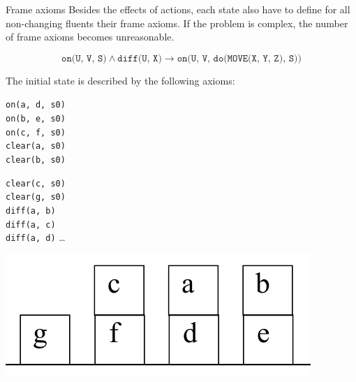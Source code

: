 \begin{descriptionlist}
    \item[Frame axioms]
        Besides the effects of actions, each state also have to define for all non-changing fluents their frame axioms.
        If the problem is complex, the number of frame axioms becomes unreasonable.
        \begin{example}
            \[ \texttt{on(U, V, S)} \land \texttt{diff(U, X)} \rightarrow \texttt{on(U, V, do(MOVE(X, Y, Z), S))} \]
        \end{example}
\end{descriptionlist}


\begin{example}
    The initial state is described by the following axioms:\\[0.5em]
    \begin{minipage}{.3\linewidth}
        \centering
        \texttt{on(a, d, s0)} \\
        \texttt{on(b, e, s0)} \\
        \texttt{on(c, f, s0)} \\
        \texttt{clear(a, s0)} \\
        \texttt{clear(b, s0)} \\
    \end{minipage}
    \begin{minipage}{.3\linewidth}
        \centering
        \texttt{clear(c, s0)} \\
        \texttt{clear(g, s0)} \\
        \texttt{diff(a, b)} \\
        \texttt{diff(a, c)} \\
        \texttt{diff(a, d)} \dots \\
    \end{minipage}
    \begin{minipage}{.3\linewidth}
        \centering
        \includegraphics[width=\linewidth]{img/_moving_block_example_green.pdf}
    \end{minipage}\\[0.5em]


\end{example}
